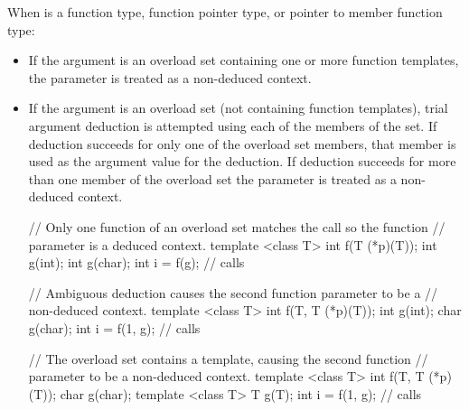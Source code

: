 \pnum
When
is a function type, function pointer type, or pointer to member
function type:
\begin{itemize}
\item
If the argument is an overload set containing one or more function templates,
the parameter is treated as a non-deduced context.
\item
If the argument is an overload set (not containing function templates), trial
argument deduction is attempted using each of the members of the set. If
deduction succeeds for only one of the overload set members, that member is
used as the argument value for the deduction. If deduction succeeds for more than
one member of the overload set the parameter is treated as a non-deduced context.

\pnum
\enterexample
\begin{codeblock}
// Only one function of an overload set matches the call so the function
// parameter is a deduced context.
template <class T> int f(T (*p)(T));
int g(int);
int g(char);
int i = f(g);       // calls 
\end{codeblock}
\exitexample

\pnum
\enterexample
\begin{codeblock}
// Ambiguous deduction causes the second function parameter to be a
// non-deduced context.
template <class T> int f(T, T (*p)(T));
int g(int);
char g(char);
int i = f(1, g);    // calls 
\end{codeblock}
\exitexample

\pnum
\enterexample
\begin{codeblock}
// The overload set contains a template, causing the second function
// parameter to be a non-deduced context.
template <class T> int f(T, T (*p)(T));
char g(char);
template <class T> T g(T);
int i = f(1, g);    // calls 
\end{codeblock}
\exitexample
\end{itemize}

